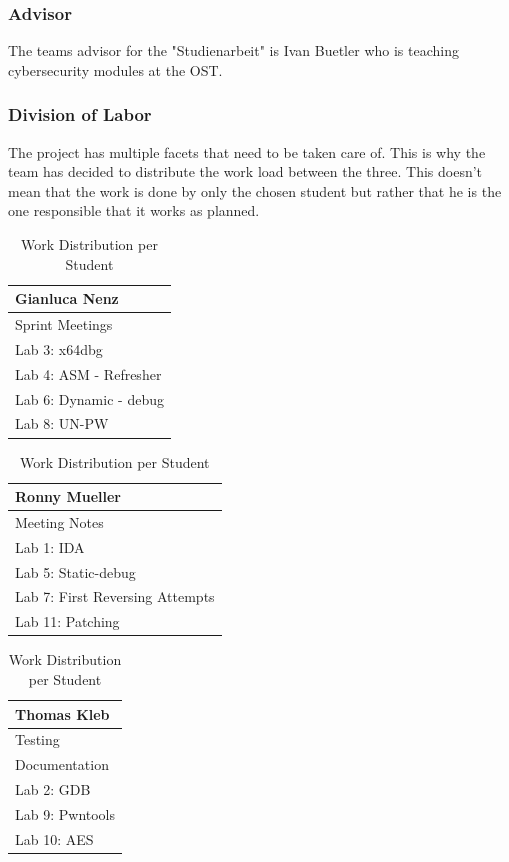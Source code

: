 \subsubsection*{Advisor}
The teams advisor for the "Studienarbeit" is Ivan Buetler who is teaching cybersecurity modules at the OST.

\subsubsection*{Division of Labor}
The project has multiple facets that need to be taken care of. This is why the team has decided to distribute the work load between the three. This doesn't mean that the work is done by only the chosen student but rather that he is the one responsible that it works as planned.
\begin{table}[H]
    \begin{tabular}[t]{||p{4cm}||}
        \hline
        Gianluca Nenz \\
        \hline\hline
        Sprint Meetings \\ 
        \hline
        Lab 3: x64dbg \\
        \hline
        Lab 4: ASM - Refresher \\ 
        \hline
        Lab 6: Dynamic - debug\\
        \hline
        Lab 8: UN-PW\\[1ex] 
        \hline
    \end{tabular}
    \hfill
    \begin{tabular}[t]{||p{4cm}||}
        \hline
        Ronny Mueller \\
        \hline\hline
        Meeting Notes \\
        \hline
        Lab 1: IDA \\ 
        \hline
        Lab 5: Static-debug \\
        \hline
        Lab 7: First Reversing Attempts \\ 
        \hline
        Lab 11: Patching\\[1ex] 
        \hline
    \end{tabular}
    \hfill
    \begin{tabular}[t]{||p{4cm}||}
        \hline
        Thomas Kleb \\
        \hline\hline
        Testing \\ 
        \hline
        Documentation \\
        \hline
        Lab 2: GDB \\ 
        \hline
        Lab 9: Pwntools\\
        \hline
        Lab 10: AES\\[1ex] 
        \hline
    \end{tabular}
    \caption{Work Distribution per Student}
    \label{work_dis}
\end{table}

